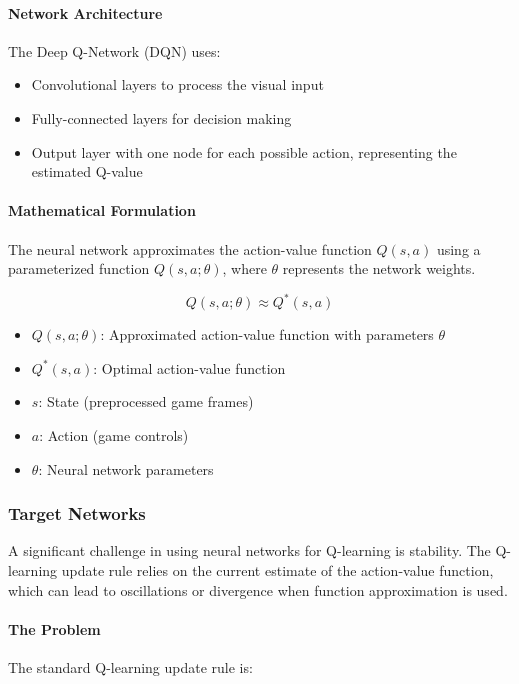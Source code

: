 \documentclass[11pt]{article}
\begin{document}
\paragraph{Network Architecture}
The Deep Q-Network (DQN) uses:
\begin{itemize}
    \item Convolutional layers to process the visual input
    \item Fully-connected layers for decision making
    \item Output layer with one node for each possible action, representing the estimated Q-value
\end{itemize}

\paragraph{Mathematical Formulation}
The neural network approximates the action-value function $Q(s,a)$ using a parameterized function $Q(s,a;\theta)$, where $\theta$ represents the network weights.

\begin{equation}
    Q(s,a;\theta) \approx Q^*(s,a)
\end{equation}

\begin{tcolorbox}[title=Notation Overview]
\begin{itemize}
    \item $Q(s,a;\theta)$: Approximated action-value function with parameters $\theta$
    \item $Q^*(s,a)$: Optimal action-value function
    \item $s$: State (preprocessed game frames)
    \item $a$: Action (game controls)
    \item $\theta$: Neural network parameters
\end{itemize}
\end{tcolorbox}

\subsubsection{Target Networks}

A significant challenge in using neural networks for Q-learning is stability. The Q-learning update rule relies on the current estimate of the action-value function, which can lead to oscillations or divergence when function approximation is used.

\paragraph{The Problem}
The standard Q-learning update rule is:
\end{document}
